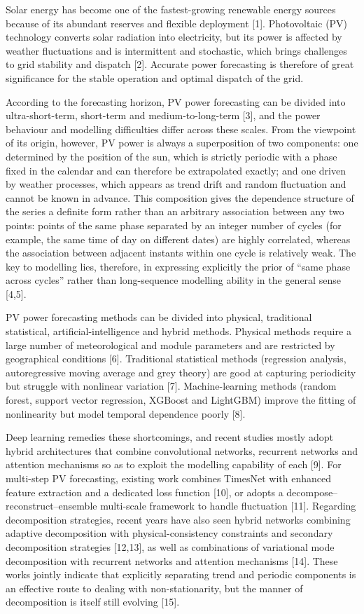 \documentclass{iopjournal}
\begin{document}
Solar energy has become one of the fastest-growing renewable energy sources because of its abundant reserves and flexible deployment [1]. Photovoltaic (PV) technology converts solar radiation into electricity, but its power is affected by weather fluctuations and is intermittent and stochastic, which brings challenges to grid stability and dispatch [2]. Accurate power forecasting is therefore of great significance for the stable operation and optimal dispatch of the grid.

According to the forecasting horizon, PV power forecasting can be divided into ultra-short-term, short-term and medium-to-long-term [3], and the power behaviour and modelling difficulties differ across these scales. From the viewpoint of its origin, however, PV power is always a superposition of two components: one determined by the position of the sun, which is strictly periodic with a phase fixed in the calendar and can therefore be extrapolated exactly; and one driven by weather processes, which appears as trend drift and random fluctuation and cannot be known in advance. This composition gives the dependence structure of the series a definite form rather than an arbitrary association between any two points: points of the same phase separated by an integer number of cycles (for example, the same time of day on different dates) are highly correlated, whereas the association between adjacent instants within one cycle is relatively weak. The key to modelling lies, therefore, in expressing explicitly the prior of ``same phase across cycles'' rather than long-sequence modelling ability in the general sense [4,5].

PV power forecasting methods can be divided into physical, traditional statistical, artificial-intelligence and hybrid methods. Physical methods require a large number of meteorological and module parameters and are restricted by geographical conditions [6]. Traditional statistical methods (regression analysis, autoregressive moving average and grey theory) are good at capturing periodicity but struggle with nonlinear variation [7]. Machine-learning methods (random forest, support vector regression, XGBoost and LightGBM) improve the fitting of nonlinearity but model temporal dependence poorly [8].

Deep learning remedies these shortcomings, and recent studies mostly adopt hybrid architectures that combine convolutional networks, recurrent networks and attention mechanisms so as to exploit the modelling capability of each [9]. For multi-step PV forecasting, existing work combines TimesNet with enhanced feature extraction and a dedicated loss function [10], or adopts a decompose--reconstruct--ensemble multi-scale framework to handle fluctuation [11]. Regarding decomposition strategies, recent years have also seen hybrid networks combining adaptive decomposition with physical-consistency constraints and secondary decomposition strategies [12,13], as well as combinations of variational mode decomposition with recurrent networks and attention mechanisms [14]. These works jointly indicate that explicitly separating trend and periodic components is an effective route to dealing with non-stationarity, but the manner of decomposition is itself still evolving [15].
\end{document}
